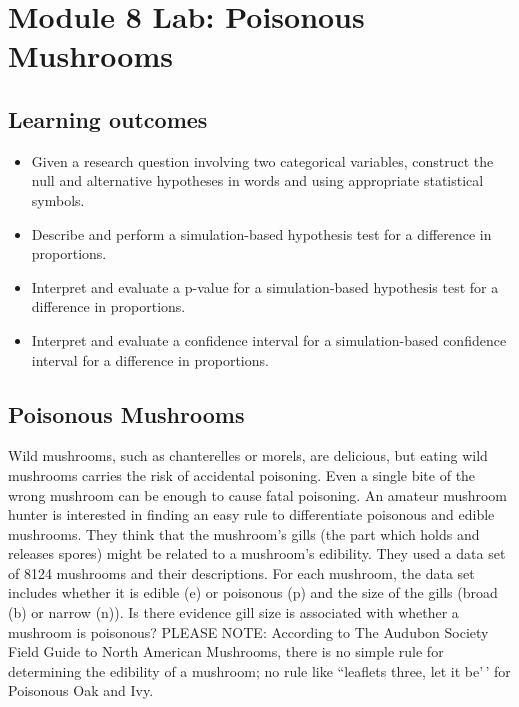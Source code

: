 \documentclass[
]{report}
\begin{document}
\section{Module 8 Lab: Poisonous Mushrooms}\label{module-8-lab-poisonous-mushrooms}


\subsection{Learning outcomes}\label{learning-outcomes-22}

\begin{itemize}
\item
  Given a research question involving two categorical variables, construct the null and alternative hypotheses
  in words and using appropriate statistical symbols.
\item
  Describe and perform a simulation-based hypothesis test for a difference in proportions.
\item
  Interpret and evaluate a p-value for a simulation-based hypothesis test for a difference in proportions.
\item
  Interpret and evaluate a confidence interval for a simulation-based confidence interval for a difference in proportions.
\end{itemize}

\subsection{Poisonous Mushrooms}\label{poisonous-mushrooms}

Wild mushrooms, such as chanterelles or morels, are delicious, but eating wild mushrooms carries the risk of accidental poisoning. Even a single bite of the wrong mushroom can be enough to cause fatal poisoning. An amateur mushroom hunter is interested in finding an easy rule to differentiate poisonous and edible mushrooms. They think that the mushroom's gills (the part which holds and releases spores) might be related to a mushroom's edibility. They used a data set of 8124 mushrooms and their descriptions. For each mushroom, the data set includes whether it is edible (e) or poisonous (p) and the size of the gills (broad (b) or narrow (n)). Is there evidence gill size is associated with whether a mushroom is poisonous? PLEASE NOTE: According to The Audubon Society Field Guide to North American Mushrooms, there is no simple rule for determining the edibility of a mushroom; no rule like ``leaflets three, let it be'\,' for Poisonous Oak and Ivy.
\end{document}
